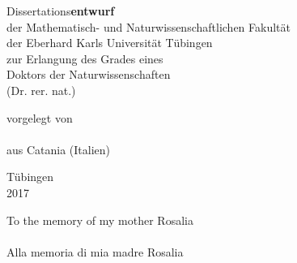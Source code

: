 \begin{titlepage}
\makeatletter %
\setlength{\parskip}{0pt}
\centering
\large
%
\linespread{1.5}\selectfont
\sffamily
\slshape
\selectfont

\vspace*{-2cm}

{\huge \bfseries
  \@title%
  \par%
}

\vspace{4cm}

{Dissertations\/\bfseries\upshape entwurf}\\
der Mathematisch- und Naturwissenschaftlichen Fakult\"at\\
der Eberhard Karls Universit\"at T\"ubingen\\
zur Erlangung des Grades eines\\
Doktors der Naturwissenschaften\\
(Dr. rer. nat.)

\vspace{4 cm}

vorgelegt von \\
\@author \\
aus Catania (Italien)

\vspace{2 cm}

T\"ubingen\\
2017

\vfill
\end{titlepage}
\clearpage
\cleardoublepage
{%
\thispagestyle{empty}
\begin{flushright}
  \null{}
  To the memory of my mother Rosalia\\
  ~\\
  Alla memoria di mia madre Rosalia

  \null
\end{flushright}}
